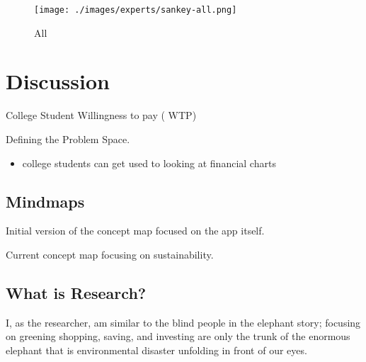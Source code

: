 \documentclass[
  letterpaper,
  DIV=11,
  numbers=noendperiod]{scrartcl}
\providecommand{\tightlist}{%
  \setlength{\itemsep}{0pt}\setlength{\parskip}{0pt}}\usepackage{longtable,booktabs,array}
\begin{document}
\begin{figure}[H]

{\centering \texttt{[image: ./images/experts/sankey-all.png]}

}

\caption{All}

\end{figure}%

\newpage

\section{Discussion}\label{discussion}

College Student Willingness to pay ( WTP)

Defining the Problem Space.

\begin{itemize}
\tightlist
\item
  college students can get used to looking at financial charts
\end{itemize}

\subsection{Mindmaps}\label{mindmaps}

Initial version of the concept map focused on the app itself.

Current concept map focusing on sustainability.

\subsection{What is Research?}\label{what-is-research}

I, as the researcher, am similar to the blind people in the elephant
story; focusing on greening shopping, saving, and investing are only the
trunk of the enormous elephant that is environmental disaster unfolding
in front of our eyes.
\end{document}
